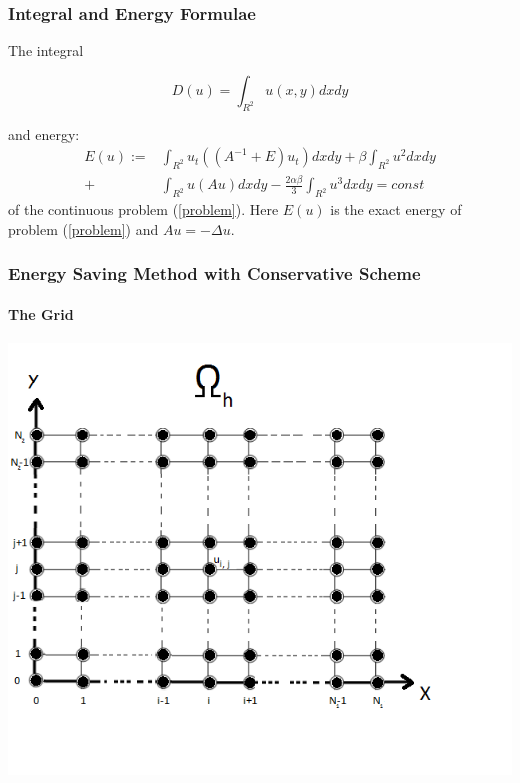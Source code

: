 \documentclass{beamer}
\newcommand{\rf}[1]{(\ref{#1})}
\begin{document}
\begin{frame}
\frametitle{Integral and Energy Formulae}
The integral 

\begin{equation}\label{int}
D(u)=\int_{R^2} u(x,y)dx dy
\end{equation}

and energy:
\begin{align}\label{ex-en}
E(u):=&\int_{R^2} u_t \left((A^{-1}+E)u_t\right) dxdy+
\beta \int_{R^2} u^2 dxdy \nonumber\\
+& \int_{R^2}u \left(A u\right) dxdy
-\frac{2 \alpha \beta}{3} \int_{R^2} u^3 dxdy =const
\end{align}
of the continuous problem \rf{problem}. Here $E(u)$ is the exact energy of problem \rf{problem} and $Au=-\Delta u$.
\end{frame}

\begin{frame}
\frametitle{Energy Saving Method with Conservative Scheme}
\framesubtitle{The Grid}

\begin{center}\vspace{0.4cm}
	\begin{minipage}[b]{0.6\linewidth}
		\includegraphics[width=\linewidth]{Omega_dah.png}
	\end{minipage}
\end{center}

\end{frame}
\end{document}
